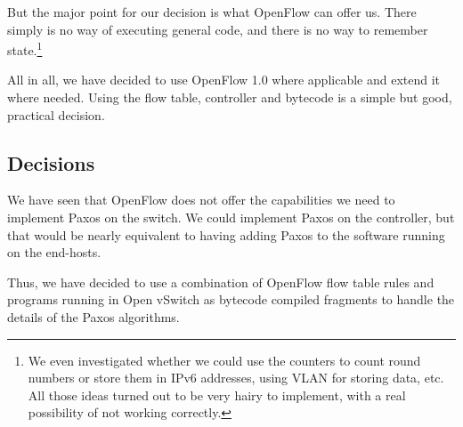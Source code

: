 But the major point for our decision is what OpenFlow can offer us.
There simply is no way of executing general code, and there is no way to
remember state.\footnote{We even investigated whether we could use the
counters to count round numbers or store them in IPv6 addresses, using VLAN
for storing data, etc.  All those ideas turned out to be very hairy to
implement, with a real possibility of not working correctly.}

All in all, we have decided to use OpenFlow 1.0 where applicable and extend
it where needed.  Using the flow table, controller and bytecode is a simple
but good, practical decision.


\subsection{Decisions}

We have seen that OpenFlow does not offer the capabilities we need to
implement Paxos on the switch.  We could implement Paxos on the controller,
but that would be nearly equivalent to having adding Paxos to the software
running on the end-hosts.

Thus, we have decided to use a combination of OpenFlow flow table rules and
programs running in Open vSwitch as bytecode compiled
fragments to handle the details of the Paxos
algorithms.


